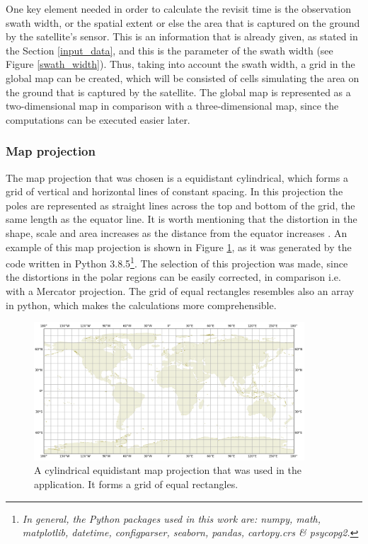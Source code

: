 One key element needed in order to calculate the revisit time is the observation swath width, or the spatial extent or else the area that is captured on the ground by the satellite's sensor. This is an information that is already given, as stated in the Section \ref{input_data}, and this is the parameter of the swath width (see Figure \ref{swath_width}). Thus, taking into account the swath width, a grid in the global map can be created, which will be consisted of cells simulating the area on the ground that is captured by the satellite. The global map is represented as a two-dimensional map in comparison with a three-dimensional map, since the computations can be executed easier later.

\bigskip
\subsubsection{Map projection}
\bigskip

The map projection that was chosen is a equidistant cylindrical, which forms a grid of vertical and horizontal lines of constant spacing. In this projection the poles are represented as straight lines across the top and bottom of the grid, the same length as the equator line. It is worth mentioning that the distortion in the shape, scale and area increases as the distance from the equator increases \cite{Lapaine}. An example of this map projection is shown in Figure \ref{map_projection}, as it was generated by the code written in Python 3.8.5\footnote{\label{Python_packages}\textit{In general, the Python packages used in this work are: numpy, math, matplotlib, datetime, configparser, seaborn, pandas, cartopy.crs \& psycopg2.}}. The selection of this projection was made, since the distortions in the polar regions can be easily corrected, in comparison i.e. with a Mercator projection. The grid of equal rectangles resembles also an array in python, which makes the calculations more comprehensible.

\begin{figure}
\centering
\includegraphics[width=0.9\textwidth]{Images/map_projection.png}\caption{A cylindrical equidistant map projection that was used in the application. It forms a grid of equal rectangles.}
\label{map_projection}
\end{figure}

